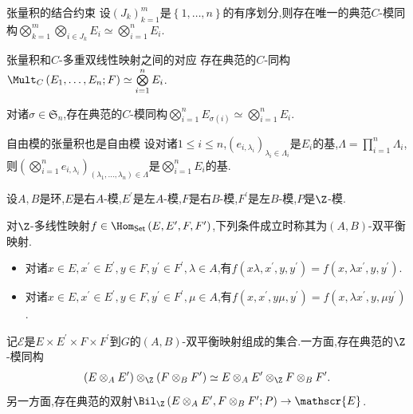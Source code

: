 \begin{proposition}{张量积的结合约束}{}
	设$\left(J_{k}\right)_{k=1}^{m}$是$\left\{1,\ldots,n\right\}$的有序划分,则存在唯一的典范$C$-模同构$\bigotimes\limits_{k=1}^{m}\bigotimes\limits_{i\in J_{k}}E_{i}\simeq\bigotimes\limits_{i=1}^{n}E_{i}$.
\end{proposition}

\begin{corollary}{张量积和$C$-多重双线性映射之间的对应}{}
	存在典范的$C$-同构$\Mult_{C}\left(E_{1},\ldots,E_{n};F\right)\simeq\bigotimes\limits_{i=1}^{n}E_{i}$.
\end{corollary}

\begin{proposition}{}{}
	对诸$\sigma\in\mathfrak{S}_{n}$,存在典范的$C$-模同构$\bigotimes\limits_{i=1}^{n}E_{\sigma\left(i\right)}\simeq\bigotimes\limits_{i=1}^{n}E_{i}$.
\end{proposition}

\begin{proposition}{自由模的张量积也是自由模}{}
	设对诸$1\leq i\leq n$,$\left(e_{i,\lambda_{i}}\right)_{\lambda_{i}\in\Lambda_{i}}$是$E_{i}$的基,$\Lambda=\prod\limits_{i=1}^{n}\Lambda_{i}$,则$\left(\bigotimes\limits_{i=1}^{n}e_{i,\lambda_{i}}\right)_{\left(\lambda_{1},\ldots,\lambda_{n}\right)\in\Lambda}$是$\bigotimes\limits_{i=1}^{n}E_{i}$的基.
\end{proposition}

\begin{remark}{}{}
	设$A,B$是环,$E$是右$A$-模,$E^{\prime}$是左$A$-模,$F$是右$B$-模,$F^{\prime}$是左$B$-模,$P$是$\Z$-模.
	
	对$\Z$-多线性映射$f\in\Hom_{\mathsf{Set}}\left(E,E^{\prime},F,F^{\prime}\right)$,下列条件成立时称其为$\left(A,B\right)$-双平衡映射.
	\begin{itemize}
		\item 对诸$x\in E,x^{\prime}\in E^{\prime},y\in F,y^{\prime}\in F^{\prime},\lambda\in A$,有$f\left(x\lambda,x^{\prime},y,y^{\prime}\right)=f\left(x,\lambda x^{\prime},y,y^{\prime}\right)$.
		\item 对诸$x\in E,x^{\prime}\in E^{\prime},y\in F,y^{\prime}\in F^{\prime},\mu\in A$,有$f\left(x,x^{\prime},y\mu,y^{\prime}\right)=f\left(x,\lambda x^{\prime},y,\mu y^{\prime}\right)$.
	\end{itemize}
	记$\mathscr{E}$是$E\times E^{\prime}\times F\times F^{\prime}$到$G$的$\left(A,B\right)$-双平衡映射组成的集合.一方面,存在典范的$\Z$-模同构
	\begin{align*}
		\left(E\otimes_{A}E^{\prime}\right)\otimes_{\Z}\left(F\otimes_{B}F^{\prime}\right)\simeq E\otimes_{A}E^{\prime}\otimes_{\Z}F\otimes_{B}F^{\prime}.
	\end{align*}
	另一方面,存在典范的双射$\Bil_{\Z}\left(E\otimes_{A}E^{\prime},F\otimes_{B}F^{\prime};P\right)\to\mathscr{E}$.
\end{remark}


